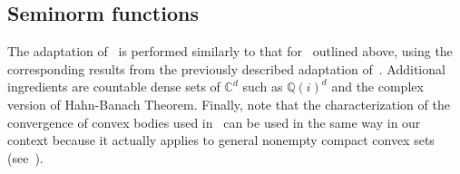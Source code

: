 \documentclass{article}
\theoremstyle{definition}
\theoremstyle{remark}
\numberwithin{equation}{section}
\newcommand{\reals}{\mathbb{R}}
\newcommand{\complex}{\mathbb{C}}
\newcommand{\1}{\mathbf{1}}
\begin{document}
    \subsection{Seminorm functions}

    The adaptation of~\cite[Section~4]{Cruz_Uribe_Bownik_Extrapolation} is performed similarly to that for~\cite[Section~2]{Cruz_Uribe_Bownik_Extrapolation} outlined above, using the corresponding results from the previously described adaptation of~\cite[Section~3]{Cruz_Uribe_Bownik_Extrapolation}. Additional ingredients are countable dense sets of $\complex^d$ such as $\mathbb{Q}(i)^d$
    and the complex version of Hahn-Banach Theorem. Finally, note that the characterization of the convergence of convex bodies used in~\cite[Section~4]{Cruz_Uribe_Bownik_Extrapolation}
    can be used in the same way in our context
    because it actually applies to general nonempty compact convex sets (see~\cite[Theorem~1.8.7]{Schneider_Convex_Bodie_1993}).
    


\end{document}
